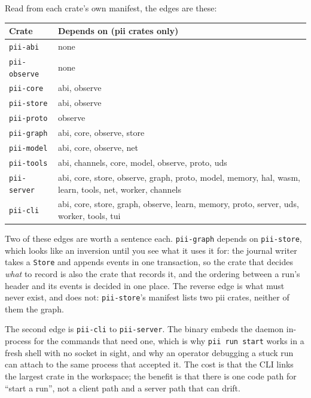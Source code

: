 Read from each crate's own manifest, the edges are these:

\begin{center}
\footnotesize
\begin{tabular}{@{}p{}p{}@{}}
	\toprule
	\textbf{Crate} & \textbf{Depends on (pii crates only)} \\
	\midrule
	\texttt{pii-abi} & none \\
	\texttt{pii-observe} & none \\
	\texttt{pii-core} & abi, observe \\
	\texttt{pii-store} & abi, observe \\
	\texttt{pii-proto} & observe \\
	\texttt{pii-graph} & abi, core, observe, store \\
	\texttt{pii-model} & abi, core, observe, net \\
	\texttt{pii-tools} & abi, channels, core, model, observe, proto, uds \\
	\texttt{pii-server} & abi, core, store, observe, graph, proto, model, memory, hal, wasm,
	learn, tools, net, worker, channels \\
	\texttt{pii-cli} & abi, core, store, graph, observe, learn, memory, proto, server, uds,
	worker, tools, tui \\
	\bottomrule
\end{tabular}
\end{center}

Two of these edges are worth a sentence each. \texttt{pii-graph} depends on \texttt{pii-store},
which looks like an inversion until you see what it uses it for: the journal writer takes a
\texttt{Store} and appends events in one transaction, so the crate that decides \emph{what} to
record is also the crate that records it, and the ordering between a run's header and its events is
decided in one place. The reverse edge is what must never exist, and does not: \texttt{pii-store}'s
manifest lists two pii crates, neither of them the graph.

The second edge is \texttt{pii-cli} to \texttt{pii-server}. The binary embeds the daemon in-process
for the commands that need one, which is why \texttt{pii run start} works in a fresh shell with no
socket in sight, and why an operator debugging a stuck run can attach to the same process that
accepted it. The cost is that the CLI links the largest crate in the workspace; the benefit is that
there is one code path for \enquote{start a run}, not a client path and a server path that can
drift.


